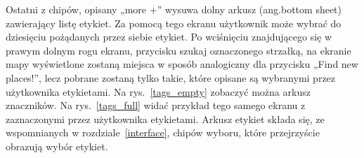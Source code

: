         Ostatni z chipów, opisany „more +” wysuwa dolny arkusz (ang.\@ bottom sheet) zawierający listę etykiet. Za pomocą tego ekranu użytkownik może wybrać do dziesięciu pożądanych przez siebie 
        etykiet. Po wciśnięciu znajdującego się w prawym dolnym rogu ekranu, przycisku szukaj oznaczonego strzałką, na ekranie mapy wyświetlone zostaną miejsca w sposób analogiczny dla przycisku
        „Find new places!”, lecz pobrane zostaną tylko takie, które opisane są wybranymi przez użytkownika etykietami. Na rys.~\ref{tags_empty} zobaczyć można arkusz znaczników. Na rys.~\ref{tags_full}
        widać przykład tego samego ekranu z zaznaczonymi przez użytkownika etykietami. Arkusz etykiet składa się, ze wspomnianych w rozdziale~\ref{interface}, chipów wyboru, które przejrzyście
        obrazują wybór etykiet.

        \vspace{1cm}
